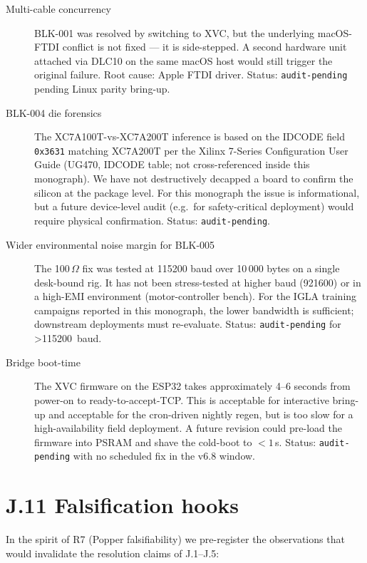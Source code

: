 \begin{description}
  \item[Multi-cable concurrency] BLK-001 was resolved by switching to
    XVC, but the underlying macOS-FTDI conflict is not fixed --- it is
    side-stepped. A second hardware unit attached via DLC10 on the same
    macOS host would still trigger the original failure. Root cause:
    Apple FTDI driver. Status: \texttt{audit-pending} pending Linux
    parity bring-up.
  \item[BLK-004 die forensics] The XC7A100T-vs-XC7A200T inference is
    based on the IDCODE field \texttt{0x3631} matching XC7A200T per the
    Xilinx 7-Series Configuration User Guide (UG470, IDCODE table; not
    cross-referenced inside this monograph). We
    have not destructively decapped a board to confirm the silicon at
    the package level. For this monograph the issue is informational,
    but a future device-level audit (e.g.\ for safety-critical
    deployment) would require physical confirmation. Status:
    \texttt{audit-pending}.
  \item[Wider environmental noise margin for BLK-005] The 100\,$\Omega$
    fix was tested at 115200 baud over 10\,000 bytes on a single
    desk-bound rig. It has not been stress-tested at higher baud
    (921600) or in a high-EMI environment (motor-controller bench). For
    the IGLA training campaigns reported in this monograph, the lower
    bandwidth is sufficient; downstream deployments must re-evaluate.
    Status: \texttt{audit-pending} for >115200~baud.
  \item[Bridge boot-time] The XVC firmware on the ESP32 takes
    approximately 4--6 seconds from power-on to ready-to-accept-TCP.
    This is acceptable for interactive bring-up and acceptable for the
    cron-driven nightly regen, but is too slow for a high-availability
    field deployment. A future revision could pre-load the firmware
    into PSRAM and shave the cold-boot to $< 1$\,s. Status:
    \texttt{audit-pending} with no scheduled fix in the v6.8 window.
\end{description}

\section*{J.11 Falsification hooks}
\label{sec:appJ-falsify}

In the spirit of R7 (Popper falsifiability) we pre-register the
observations that would invalidate the resolution claims of J.1--J.5:

